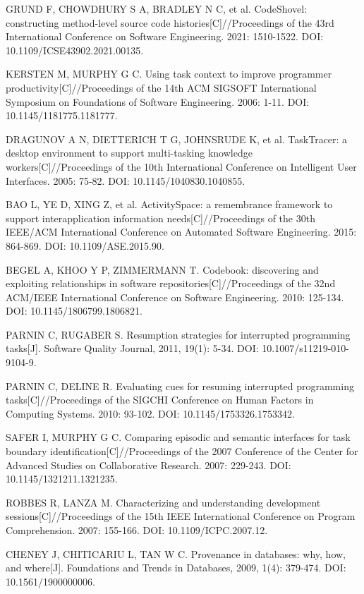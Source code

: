 {\begin{tjreflist}
\item GRUND F, CHOWDHURY S A, BRADLEY N C, et al. CodeShovel: constructing method-level source code histories[C]//Proceedings of the 43rd International Conference on Software Engineering. 2021: 1510-1522. DOI: 10.1109/ICSE43902.2021.00135.
\item KERSTEN M, MURPHY G C. Using task context to improve programmer productivity[C]//Proceedings of the 14th ACM SIGSOFT International Symposium on Foundations of Software Engineering. 2006: 1-11. DOI: 10.1145/1181775.1181777.
\item DRAGUNOV A N, DIETTERICH T G, JOHNSRUDE K, et al. TaskTracer: a desktop environment to support multi-tasking knowledge workers[C]//Proceedings of the 10th International Conference on Intelligent User Interfaces. 2005: 75-82. DOI: 10.1145/1040830.1040855.
\item BAO L, YE D, XING Z, et al. ActivitySpace: a remembrance framework to support interapplication information needs[C]//Proceedings of the 30th IEEE/ACM International Conference on Automated Software Engineering. 2015: 864-869. DOI: 10.1109/ASE.2015.90.
\item BEGEL A, KHOO Y P, ZIMMERMANN T. Codebook: discovering and exploiting relationships in software repositories[C]//Proceedings of the 32nd ACM/IEEE International Conference on Software Engineering. 2010: 125-134. DOI: 10.1145/1806799.1806821.
\item PARNIN C, RUGABER S. Resumption strategies for interrupted programming tasks[J]. Software Quality Journal, 2011, 19(1): 5-34. DOI: 10.1007/s11219-010-9104-9.
\item PARNIN C, DELINE R. Evaluating cues for resuming interrupted programming tasks[C]//Proceedings of the SIGCHI Conference on Human Factors in Computing Systems. 2010: 93-102. DOI: 10.1145/1753326.1753342.
\item SAFER I, MURPHY G C. Comparing episodic and semantic interfaces for task boundary identification[C]//Proceedings of the 2007 Conference of the Center for Advanced Studies on Collaborative Research. 2007: 229-243. DOI: 10.1145/1321211.1321235.
\item ROBBES R, LANZA M. Characterizing and understanding development sessions[C]//Proceedings of the 15th IEEE International Conference on Program Comprehension. 2007: 155-166. DOI: 10.1109/ICPC.2007.12.
\item CHENEY J, CHITICARIU L, TAN W C. Provenance in databases: why, how, and where[J]. Foundations and Trends in Databases, 2009, 1(4): 379-474. DOI: 10.1561/1900000006.

\end{tjreflist}}
